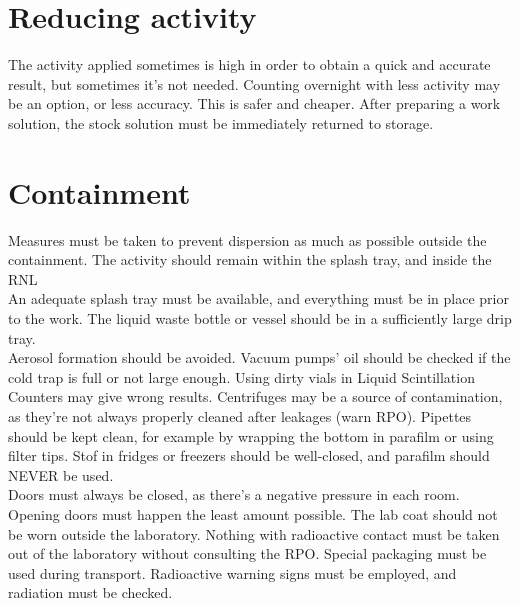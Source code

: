 \section{Reducing activity}
The activity applied sometimes is high in order to obtain a quick and accurate result, but sometimes it's not needed. Counting overnight with less activity may be an option, or less accuracy. This is safer and cheaper. After preparing a work solution, the stock solution must be immediately returned to storage.
\section{Containment}
Measures must be taken to prevent dispersion as much as possible outside the containment. The activity should remain within the splash tray, and inside the RNL\\
An adequate splash tray must be available, and everything must be in place prior to the work. The liquid waste bottle or vessel should be in a sufficiently large drip tray. \\
Aerosol formation should be avoided. Vacuum pumps' oil should be checked if the cold trap is full or not large enough. Using dirty vials in Liquid Scintillation Counters may give wrong results. Centrifuges may be a source of contamination, as they're not always properly cleaned after leakages (warn RPO). Pipettes should be kept clean, for example by wrapping the bottom in parafilm or using filter tips. Stof in fridges or freezers should be well-closed, and parafilm should NEVER be used. \\
Doors must always be closed, as there's a negative pressure in each room. Opening doors must happen the least amount possible. The lab coat should not be worn outside the laboratory. Nothing with radioactive contact must be taken out of the laboratory without consulting the RPO. Special packaging must be used during transport. Radioactive warning signs must be employed, and radiation must be checked.
